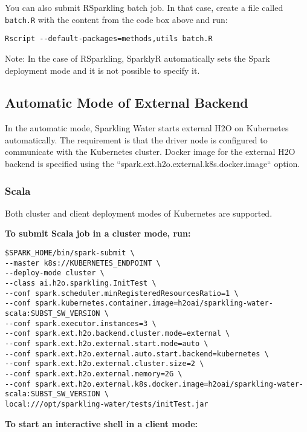 You can also submit RSparkling batch job. In that case, create a file called \texttt{batch.R} with the content
from the code box above and run:

\begin{lstlisting}[style=Bash]
Rscript --default-packages=methods,utils batch.R
\end{lstlisting}

Note: In the case of RSparkling, SparklyR automatically sets the Spark deployment mode and it is not possible to specify it.

\subsection{Automatic Mode of External Backend}

In the automatic mode, Sparkling Water starts external H2O on Kubernetes automatically. The requirement is that the
driver node is configured to communicate with the Kubernetes cluster. Docker image for the external H2O backend
is specified using the ``spark.ext.h2o.external.k8s.docker.image`` option.

\subsubsection{Scala}

Both cluster and client deployment modes of Kubernetes are supported.

\textbf{To submit Scala job in a cluster mode, run:}

\begin{lstlisting}[style=Bash]
$SPARK_HOME/bin/spark-submit \
--master k8s://KUBERNETES_ENDPOINT \
--deploy-mode cluster \
--class ai.h2o.sparkling.InitTest \
--conf spark.scheduler.minRegisteredResourcesRatio=1 \
--conf spark.kubernetes.container.image=h2oai/sparkling-water-scala:SUBST_SW_VERSION \
--conf spark.executor.instances=3 \
--conf spark.ext.h2o.backend.cluster.mode=external \
--conf spark.ext.h2o.external.start.mode=auto \
--conf spark.ext.h2o.external.auto.start.backend=kubernetes \
--conf spark.ext.h2o.external.cluster.size=2 \
--conf spark.ext.h2o.external.memory=2G \
--conf spark.ext.h2o.external.k8s.docker.image=h2oai/sparkling-water-scala:SUBST_SW_VERSION \
local:///opt/sparkling-water/tests/initTest.jar
\end{lstlisting}

\textbf{To start an interactive shell in a client mode:}

